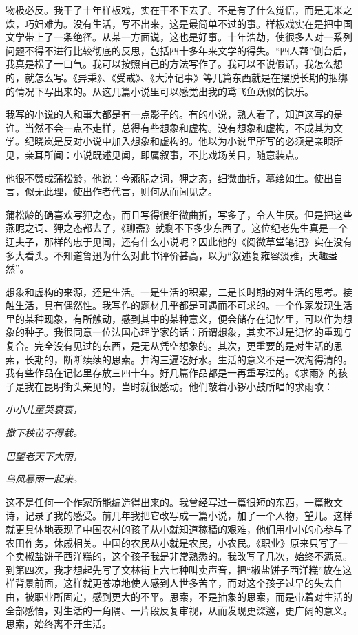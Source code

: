 \documentclass[fontset=fandol,12pt,a5paper]{ctexbook}
\begin{document}
物极必反。我干了十年样板戏，实在干不下去了。不是有了什么觉悟，而是无米之炊，巧妇难为。没有生活，写不出来，这是最简单不过的事。样板戏实在是把中国文学带上了一条绝径。从某一方面说，这也是好事。十年浩劫，使很多人对一系列问题不得不进行比较彻底的反思，包括四十多年来文学的得失。“四人帮”倒台后，我真是松了一口气。我可以按照自己的方法写作了。我可以不说假话，我怎么想的，就怎么写。《异秉》、《受戒》、《大淖记事》等几篇东西就是在摆脱长期的捆绑的情况下写出来的。从这几篇小说里可以感觉出我的鸢飞鱼跃似的快乐。

我写的小说的人和事大都是有一点影子的。有的小说，熟人看了，知道这写的是谁。当然不会一点不走样，总得有些想象和虚构。没有想象和虚构，不成其为文学。纪晓岚是反对小说中加入想象和虚构的。他以为小说里所写的必须是亲眼所见，亲耳所闻：小说既述见闻，即属叙事，不比戏场关目，随意装点。

他很不赞成蒲松龄，他说：今燕昵之词，狎之态，细微曲折，摹绘如生。使出自言，似无此理，使出作者代言，则何从而闻见之。

蒲松龄的确喜欢写狎之态，而且写得很细微曲折，写多了，令人生厌。但是把这些燕昵之词、狎之态都去了，《聊斋》就剩不下多少东西了。这位纪老先生真是一个迂夫子，那样的忠于见闻，还有什么小说呢？因此他的《阅微草堂笔记》实在没有多大看头。不知道鲁迅为什么对此书评价甚高，以为“叙述复雍容淡雅，天趣盎然”。

想象和虚构的来源，还是生活。一是生活的积累，二是长时期的对生活的思考。接触生活，具有偶然性。我写作的题材几乎都是可遇而不可求的。一个作家发现生活里的某种现象，有所触动，感到其中的某种意义，便会储存在记忆里，可以作为想象的种子。我很同意一位法国心理学家的话：所谓想象，其实不过是记忆的重现与复合。完全没有见过的东西，是无从凭空想象的。其次，更重要的是对生活的思索，长期的，断断续续的思索。井淘三遍吃好水。生活的意义不是一次淘得清的。我有些作品在记忆里存放三四十年。好几篇作品都是一再重写过的。《求雨》的孩子是我在昆明街头亲见的，当时就很感动。他们敲着小锣小鼓所唱的求雨歌：

\centerline{\emph{小小儿童哭哀哀，}}
\centerline{\emph{撒下秧苗不得栽。}}
\centerline{\emph{巴望老天下大雨，}}
\centerline{\emph{乌风暴雨一起来。}}

这不是任何一个作家所能编造得出来的。我曾经写过一篇很短的东西，一篇散文诗，记录了我的感受。前几年我把它改写成一篇小说，加了一个人物，望儿。这样就更具体地表现了中国农村的孩子从小就知道稼穑的艰难，他们用小小的心参与了农田作务，休戚相关。中国的农民从小就是农民，小农民。《职业》原来只写了一个卖椒盐饼子西洋糕的，这个孩子我是非常熟悉的。我改写了几次，始终不满意。到第四次，我才想起先写了文林街上六七种叫卖声音，把“椒盐饼子西洋糕”放在这样背景前面，这样就更苍凉地使人感到人世多苦辛，而对这个孩子过早的失去自由，被职业所固定，感到更大的不平。思索，不是抽象的思索，而是带着对生活的全部感悟，对生活的一角隅、一片段反复审视，从而发现更深邃，更广阔的意义。思索，始终离不开生活。
\end{document}
